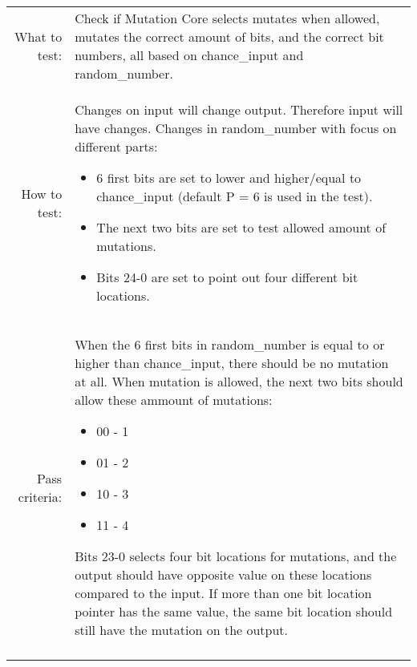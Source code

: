 \begin{table}[H]
  \begin{tabular}{r | p{8cm}}
    \noalign{\smallskip}\hline\noalign{\smallskip}
    
    What to test:  & Check if Mutation Core selects mutates when allowed, mutates the 
                     correct amount of bits, and the correct bit numbers, all based
                     on chance\_input and random\_number.\\

    \noalign{\smallskip}\hline\noalign{\smallskip}

    How to test:   &    Changes on input will change output. Therefore input will have 
                        changes.
                        Changes in random\_number with focus on different parts: 
                        \begin{itemize}
                            \item 6 first bits are set to lower and higher/equal to
                                  chance\_input (default P = 6 is used in the test). 
                            \item The next two bits are set to test allowed amount of 
                                  mutations.
                            \item Bits 24-0 are set to point out four different bit 
                                  locations.
                        \end{itemize}
                        \\
                      
    \noalign{\smallskip}\hline\noalign{\smallskip}

    Pass criteria: &    When the 6 first bits in random\_number is equal to or higher 
                        than chance\_input, there should be no mutation at all.
                        When mutation is allowed, the next two bits should allow these 
                        ammount of mutations:  
                        \begin{itemize}
                            \item 00 - 1
                            \item 01 - 2
                            \item 10 - 3
                            \item 11 - 4
                        \end{itemize}
                        Bits 23-0 selects four bit locations for mutations, and the 
                        output should have opposite value on these locations compared to
                        the input.
                        If more than one bit location pointer has the same value, the 
                        same bit location should still have the mutation on the output.
                                                \\
    \noalign{\smallskip}\hline\noalign{\smallskip}
    

\end{tabular}
\end{table}
